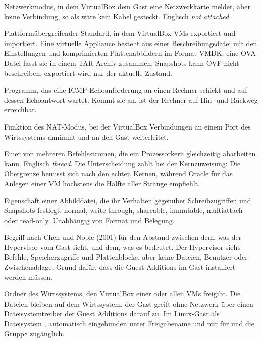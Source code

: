\begin{glossar}
Netzwerkmodus, in dem VirtualBox dem Gast eine Netzwerkkarte meldet, aber keine Verbindung, so als wäre kein Kabel gesteckt. Englisch \emph{not attached}.

Plattformübergreifender Standard, in dem VirtualBox VMs exportiert und importiert. Eine virtuelle Appliance besteht aus einer Beschreibungsdatei  mit den Einstellungen und komprimierten Plattenabbildern im Format VMDK; eine OVA-Datei fasst sie in einem TAR-Archiv zusammen. Snapshots kann OVF nicht beschreiben, exportiert wird nur der aktuelle Zustand.

Programm, das eine ICMP-Echoanforderung an einen Rechner schickt und auf dessen Echoantwort wartet. Kommt sie an, ist der Rechner auf Hin- und Rückweg erreichbar.

Funktion des NAT-Modus, bei der VirtualBox Verbindungen an einem Port des Wirtssystems annimmt und an den Gast weiterleitet.

Einer von mehreren Befehlsströmen, die ein Prozessorkern gleichzeitig abarbeiten kann. Englisch \emph{thread}. Die Unterscheidung zählt bei der Kernzuweisung: Die Obergrenze bemisst sich nach den echten Kernen, während Oracle für das Anlegen einer VM höchstens die Hälfte aller Stränge empfiehlt.

Eigenschaft einer Abbilddatei, die ihr Verhalten gegenüber Schreibzugriffen und Snapshots festlegt: normal, write-through, shareable, immutable, multiattach oder read-only. Unabhängig von Format und Belegung.

Begriff nach Chen und Noble (2001) für den Abstand zwischen dem, was der Hypervisor vom Gast sieht, und dem, was es bedeutet. Der Hypervisor sieht Befehle, Speicherzugriffe und Plattenblöcke, aber keine Dateien, Benutzer oder Zwischenablage. Grund dafür, dass die Guest Additions im Gast installiert werden müssen.

Ordner des Wirtssystems, den VirtualBox einer oder allen VMs freigibt. Die Dateien bleiben auf dem Wirtssystem, der Gast greift ohne Netzwerk über einen Dateisystemtreiber der Guest Additions darauf zu. Im Linux-Gast als Dateisystem , automatisch eingebunden unter Freigabename und nur für  und die Gruppe  zugänglich.


\end{glossar}
